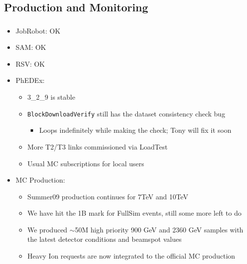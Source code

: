 \documentclass{beamer}
\newcommand{\ca}{\ensuremath{\sim}}
\begin{document}
\subsection{Production and Monitoring}
\begin{frame}
\frametitle{}
\begin{itemize}
	\item JobRobot: OK
	\item SAM: OK
	\item RSV: OK
	\item PhEDEx:
	\begin{itemize}
		\item 3\_2\_9 is stable
		\item {\tt BlockDownloadVerify} still has the dataset consistency check bug
		\begin{itemize}
			\item Loops indefinitely while making the check; Tony will fix it soon
		\end{itemize}
		\item More T2/T3 links commissioned via LoadTest
		\item Usual MC subscriptions for local users
	\end{itemize}
	\item MC Production:
	\begin{itemize}
		\item Summer09 production continues for 7TeV and 10TeV
		\item We have hit the 1B mark for FullSim events, still some more left to do
		\item We produced \ca{}50M high priority 900 GeV and 2360 GeV samples with the latest detector conditions and beamspot values
		\item Heavy Ion requests are now integrated to the official MC production
	\end{itemize}

\end{itemize}
\end{frame}
\end{document}
